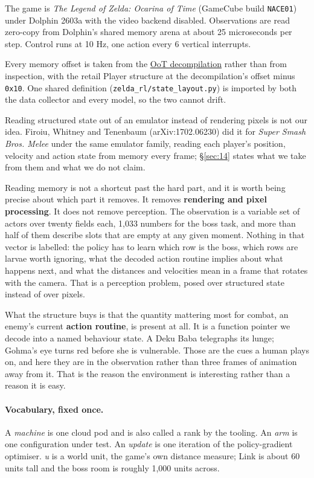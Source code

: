 \documentclass[11pt]{article}
\begin{document}
The game is \emph{The Legend of Zelda: Ocarina of Time} (GameCube build \texttt{NACE01}) under Dolphin 2603a with the video backend disabled. Observations are read zero-copy from Dolphin's shared memory arena at about 25 microseconds per step. Control runs at 10 Hz, one action every 6 vertical interrupts.

Every memory offset is taken from the \href{https://github.com/zeldaret/oot}{OoT decompilation} rather than from inspection, with the retail Player structure at the decompilation's offset minus \texttt{0x10}. One shared definition (\texttt{zelda\_\allowbreak{}rl/\allowbreak{}state\_\allowbreak{}layout.py}) is imported by both the data collector and every model, so the two cannot drift.

Reading structured state out of an emulator instead of rendering pixels is not our idea. Firoiu, Whitney and Tenenbaum (arXiv:1702.06230) did it for \emph{Super Smash Bros. Melee} under the same emulator family, reading each player's position, velocity and action state from memory every frame; \S\ref{sec:14} states what we take from them and what we do not claim.

Reading memory is not a shortcut past the hard part, and it is worth being precise about which part it removes. It removes \textbf{rendering and pixel processing}. It does not remove perception. The observation is a variable set of actors over twenty fields each, 1,033 numbers for the boss task, and more than half of them describe slots that are empty at any given moment. Nothing in that vector is labelled: the policy has to learn which row is the boss, which rows are larvae worth ignoring, what the decoded action routine implies about what happens next, and what the distances and velocities mean in a frame that rotates with the camera. That is a perception problem, posed over structured state instead of over pixels.

What the structure buys is that the quantity mattering most for combat, an enemy's current \textbf{action routine}, is present at all. It is a function pointer we decode into a named behaviour state. A Deku Baba telegraphs its lunge; Gohma's eye turns red before she is vulnerable. Those are the cues a human plays on, and here they are in the observation rather than three frames of animation away from it. That is the reason the environment is interesting rather than a reason it is easy.

\paragraph{Vocabulary, fixed once.} A \emph{machine} is one cloud pod and is also called a rank by the tooling. An \emph{arm} is one configuration under test. An \emph{update} is one iteration of the policy-gradient optimiser. \emph{u} is a world unit, the game's own distance measure; Link is about 60 units tall and the boss room is roughly 1,000 units across.
\end{document}
